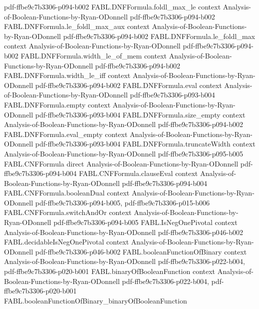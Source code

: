 \begin{theorem}
  {pdf-ffbe9c7b3306-p094-b002}
\proofstep
  {FABL.DNFFormula.foldl_max_le}
  {context}
  {Analysis-of-Boolean-Functions-by-Ryan-ODonnell}
  {pdf-ffbe9c7b3306-p094-b002}
\proofstep
  {FABL.DNFFormula.le_foldl_max_aux}
  {context}
  {Analysis-of-Boolean-Functions-by-Ryan-ODonnell}
  {pdf-ffbe9c7b3306-p094-b002}
\proofstep
  {FABL.DNFFormula.le_foldl_max}
  {context}
  {Analysis-of-Boolean-Functions-by-Ryan-ODonnell}
  {pdf-ffbe9c7b3306-p094-b002}
\proofstep
  {FABL.DNFFormula.width_le_of_mem}
  {context}
  {Analysis-of-Boolean-Functions-by-Ryan-ODonnell}
  {pdf-ffbe9c7b3306-p094-b002}
\proofstep
  {FABL.DNFFormula.width_le_iff}
  {context}
  {Analysis-of-Boolean-Functions-by-Ryan-ODonnell}
  {pdf-ffbe9c7b3306-p094-b002}
\proofstep
  {FABL.DNFFormula.eval}
  {context}
  {Analysis-of-Boolean-Functions-by-Ryan-ODonnell}
  {pdf-ffbe9c7b3306-p093-b004}
\proofstep
  {FABL.DNFFormula.empty}
  {context}
  {Analysis-of-Boolean-Functions-by-Ryan-ODonnell}
  {pdf-ffbe9c7b3306-p093-b004}
\proofstep
  {FABL.DNFFormula.size_empty}
  {context}
  {Analysis-of-Boolean-Functions-by-Ryan-ODonnell}
  {pdf-ffbe9c7b3306-p094-b002}
\proofstep
  {FABL.DNFFormula.eval_empty}
  {context}
  {Analysis-of-Boolean-Functions-by-Ryan-ODonnell}
  {pdf-ffbe9c7b3306-p093-b004}
\proofstep
  {FABL.DNFFormula.truncateWidth}
  {context}
  {Analysis-of-Boolean-Functions-by-Ryan-ODonnell}
  {pdf-ffbe9c7b3306-p095-b005}
\proofstep
  {FABL.CNFFormula}
  {direct}
  {Analysis-of-Boolean-Functions-by-Ryan-ODonnell}
  {pdf-ffbe9c7b3306-p094-b004}
\proofstep
  {FABL.CNFFormula.clauseEval}
  {context}
  {Analysis-of-Boolean-Functions-by-Ryan-ODonnell}
  {pdf-ffbe9c7b3306-p094-b004}
\proofstep
  {FABL.CNFFormula.booleanDual}
  {context}
  {Analysis-of-Boolean-Functions-by-Ryan-ODonnell}
  {pdf-ffbe9c7b3306-p094-b005,
    pdf-ffbe9c7b3306-p015-b006}
\proofstep
  {FABL.CNFFormula.switchAndOr}
  {context}
  {Analysis-of-Boolean-Functions-by-Ryan-ODonnell}
  {pdf-ffbe9c7b3306-p094-b005}
\proofstep
  {FABL.IsNegOnePivotal}
  {context}
  {Analysis-of-Boolean-Functions-by-Ryan-ODonnell}
  {pdf-ffbe9c7b3306-p046-b002}
\proofstep
  {FABL.decidableIsNegOnePivotal}
  {context}
  {Analysis-of-Boolean-Functions-by-Ryan-ODonnell}
  {pdf-ffbe9c7b3306-p046-b002}
\proofstep
  {FABL.booleanFunctionOfBinary}
  {context}
  {Analysis-of-Boolean-Functions-by-Ryan-ODonnell}
  {pdf-ffbe9c7b3306-p022-b004,
    pdf-ffbe9c7b3306-p020-b001}
\proofstep
  {FABL.binaryOfBooleanFunction}
  {context}
  {Analysis-of-Boolean-Functions-by-Ryan-ODonnell}
  {pdf-ffbe9c7b3306-p022-b004,
    pdf-ffbe9c7b3306-p020-b001}
\proofstep
  {FABL.booleanFunctionOfBinary_binaryOfBooleanFunction}

\end{theorem}
